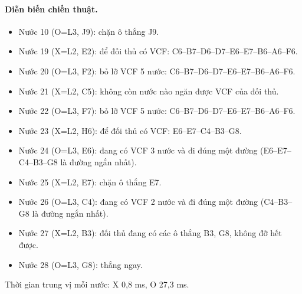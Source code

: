 \paragraph{Diễn biến chiến thuật.}
\begin{itemize}\small
\setlength{\itemsep}{0pt}
  \item Nước 10 (O=L3, J9): chặn ô thắng J9.
  \item Nước 19 (X=L2, E2): để đối thủ có VCF: C6--B7--D6--D7--E6--E7--B6--A6--F6.
  \item Nước 20 (O=L3, F2): bỏ lỡ VCF 5 nước: C6--B7--D6--D7--E6--E7--B6--A6--F6.
  \item Nước 21 (X=L2, C5): không còn nước nào ngăn được VCF của đối thủ.
  \item Nước 22 (O=L3, F7): bỏ lỡ VCF 5 nước: C6--B7--D6--D7--E6--E7--B6--A6--F6.
  \item Nước 23 (X=L2, H6): để đối thủ có VCF: E6--E7--C4--B3--G8.
  \item Nước 24 (O=L3, E6): đang có VCF 3 nước và đi đúng một đường (E6--E7--C4--B3--G8 là đường ngắn nhất).
  \item Nước 25 (X=L2, E7): chặn ô thắng E7.
  \item Nước 26 (O=L3, C4): đang có VCF 2 nước và đi đúng một đường (C4--B3--G8 là đường ngắn nhất).
  \item Nước 27 (X=L2, B3): đối thủ đang có các ô thắng B3, G8, không đỡ hết được.
  \item Nước 28 (O=L3, G8): thắng ngay.
\end{itemize}
Thời gian trung vị mỗi nước: X 0,8 ms, O 27,3 ms.
\clearpage

